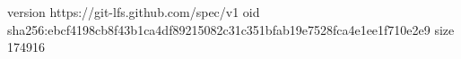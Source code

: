 version https://git-lfs.github.com/spec/v1
oid sha256:ebcf4198cb8f43b1ca4df89215082c31c351bfab19e7528fca4e1ee1f710e2e9
size 174916
